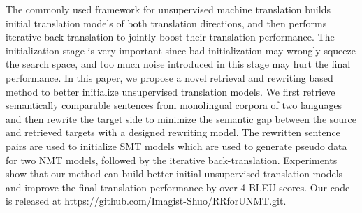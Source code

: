 The commonly used framework for unsupervised machine translation builds initial translation models of both translation directions, and then performs iterative back-translation to jointly boost their translation performance. The initialization stage is very important since bad initialization may wrongly squeeze the search space, and too much noise introduced in this stage may hurt the final performance. In this paper, we propose a novel retrieval and rewriting based method to better initialize unsupervised translation models. We first retrieve semantically comparable sentences from monolingual corpora of two languages and then rewrite the target side to minimize the semantic gap between the source and retrieved targets with a designed rewriting model. The rewritten sentence pairs are used to initialize SMT models which are used to generate pseudo data for two NMT models, followed by the iterative back-translation. Experiments show that our method can build better initial unsupervised translation models and improve the final translation performance by over 4 BLEU scores. Our code is released at https://github.com/Imagist-Shuo/RRforUNMT.git.
